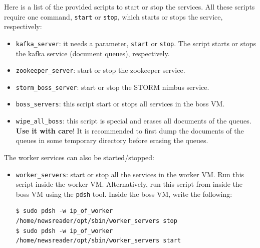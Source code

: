 \documentclass[a4]{article}
\begin{document}
Here is a list of the provided scripts to start or stop the services. All
these scripts require one command, \texttt{start} or \texttt{stop}, which
starts or stops the service, respectively:
\begin{itemize}
\item \texttt{kafka\_server}: it needs a parameter, \texttt{start} or
  \texttt{stop}. The script starts or stops the kafka service (document
  queues), respectively.
\item \texttt{zookeeper\_server}: start or stop the zookeeper service.
\item \texttt{storm\_boss\_server}: start or stop the STORM nimbus service.
\item \texttt{boss\_servers}: this script start or stops all services in the
  boss VM.
\item \texttt{wipe\_all\_boss}: this script is special and erases all
  documents of the queues. \textbf{Use it with care}! It is recommended to
  first dump the documents of the queues in some temporary directory before
  erasing the queues.
\end{itemize}

The worker services can also be started/stopped:
\begin{itemize}
\item \texttt{worker\_servers}: start or stop all the services in the worker
  VM. Run this script inside the worker VM. Alternatively, run this script
  from inside the boss VM using the \texttt{pdsh} tool. Inside the boss VM,
  write the following:
\begin{verbatim}
$ sudo pdsh -w ip_of_worker /home/newsreader/opt/sbin/worker_servers stop
$ sudo pdsh -w ip_of_worker /home/newsreader/opt/sbin/worker_servers start
\end{verbatim}
\end{itemize}
\end{document}

